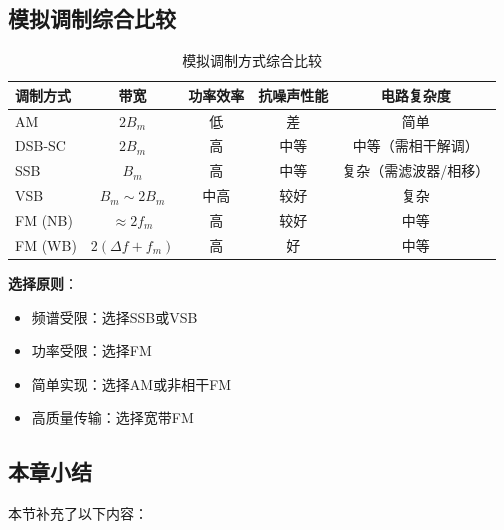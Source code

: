 \subsection{模拟调制综合比较}
\label{sec:analog_mod_comparison}

\begin{table}[htbp]
    \centering
    \caption{模拟调制方式综合比较}
    \begin{tabular}{l|c|c|c|c}
        \hline
        调制方式 & 带宽 & 功率效率 & 抗噪声性能 & 电路复杂度 \\
        \hline
        AM & $2B_m$ & 低 & 差 & 简单 \\
        DSB-SC & $2B_m$ & 高 & 中等 & 中等（需相干解调） \\
        SSB & $B_m$ & 高 & 中等 & 复杂（需滤波器/相移） \\
        VSB & $B_m \sim 2B_m$ & 中高 & 较好 & 复杂 \\
        FM (NB) & $\approx 2f_m$ & 高 & 较好 & 中等 \\
        FM (WB) & $2(\Delta f + f_m)$ & 高 & 好 & 中等 \\
        \hline
    \end{tabular}
    \label{tab:analog_mod_comparison}
\end{table}

\textbf{选择原则}：
\begin{itemize}
    \item 频谱受限：选择SSB或VSB
    \item 功率受限：选择FM
    \item 简单实现：选择AM或非相干FM
    \item 高质量传输：选择宽带FM
\end{itemize}

\subsection*{本章小结}

本节补充了以下内容：

